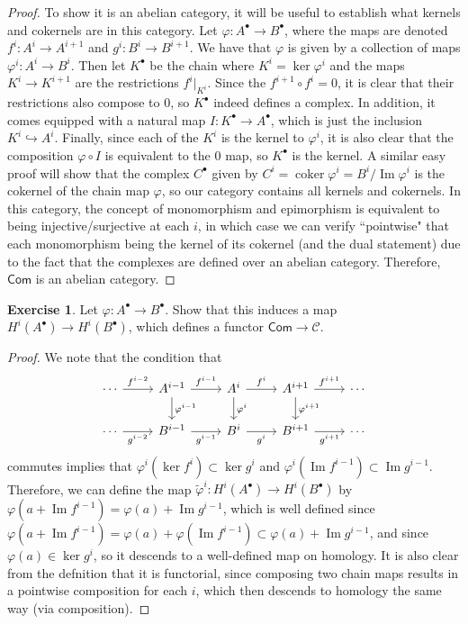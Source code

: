 \documentclass[psamsfonts]{amsart}
\theoremstyle{definition}
\newtheorem{exer}[thm]{Exercise}
\theoremstyle{remark}
\DeclareMathOperator{\im}{Im}
\DeclareMathOperator{\coker}{coker}
\begin{document}
\begin{proof}
To show it is an abelian category, it will be useful to establish what kernels and cokernels are in this category. Let $\varphi : A^\bullet \to B^\bullet$, where the maps are denoted $f^i: A^i \to A^{i+1}$ and $g^i : B^i \to B^{i+1}$. We have that $\varphi$ is given by a collection of maps $\varphi^i : A^i \to B^i$. Then let $K^\bullet$ be the chain where $K^i = \ker\varphi^i$ and the maps $K^i \to K^{i+1}$ are the restrictions $f^i\big\vert_{K^i}$. Since the $f^{i+1} \circ f^i = 0$, it is clear that their restrictions also compose to $0$, so $K^\bullet$ indeed defines a complex. In addition, it comes equipped with a natural map $I : K^\bullet \to A^\bullet$, which is just the inclusion $K^i \hookrightarrow A^i$. Finally, since each of the $K^i$ is the kernel to $\varphi^i$, it is also clear that the composition $\varphi \circ I$ is equivalent to the $0$ map, so $K^\bullet$ is the kernel. A similar easy proof will show that the complex $C^\bullet$ given by $C^i = \coker \varphi^i = B^i / \im\varphi^i$ is the cokernel of the chain map $\varphi$, so our category contains all kernels and cokernels. In this category, the concept of monomorphism and epimorphism is equivalent to being injective/surjective at each $i$, in which case we can verify ``pointwise" that each monomorphism being the kernel of its cokernel (and the dual statement) due to the fact that the complexes are defined over an abelian category. Therefore, $\mathsf{Com}$ is an abelian category.
\end{proof}
%
\begin{exer}
Let $\varphi : A^\bullet \to B^\bullet$. Show that this induces a map $H^i(A^\bullet) \to H^i(B^\bullet)$, which defines a functor $\mathsf{Com} \to \mathscr{C}$.
\end{exer}
\begin{proof}
We note that the condition that
$$\begin{tikzcd}
\cdots \arrow[r, "f^{i-2}"] & A^{i-1} \arrow[d, "\varphi^{i-1}"] \arrow[r, "f^{i-1}"] & A^i \arrow[d, "\varphi^{i}"] \arrow[r, "f^i"] & A^{i+1} \arrow[d, "\varphi^{i+1}"] \arrow[r, "f^{i+1}"] & \cdots \\
\cdots \arrow[r, "g^{i-2}"'] & B^{i-1} \arrow[r, "g^{i-1}"'] & B^i \arrow[r, "g^i"'] & B^{i+1} \arrow[r, "g^{i+1}"'] & \cdots 
\end{tikzcd}$$
commutes implies that $\varphi^i(\ker f^i) \subset \ker g^i$ and $\varphi^i(\im f^{i-1}) \subset \im g^{i-1}$. Therefore, we can define the map $\tilde{\varphi}^i : H^i(A^\bullet) \to H^i(B^\bullet)$ by $\varphi(a + \im f^{i-1}) = \varphi(a) + \im g^{i-1}$, which is well defined since $\varphi(a + \im f^{i-1}) = \varphi(a) + \varphi(\im f^{i-1}) \subset \varphi(a) + \im g^{i-1}$, and since $\varphi(a) \in \ker g^i$, so it descends to a well-defined map on homology. It is also clear from the defnition that it is functorial, since composing two chain maps results in a pointwise composition for each $i$, which then descends to homology the same way (via composition).
\end{proof}
\end{document}
